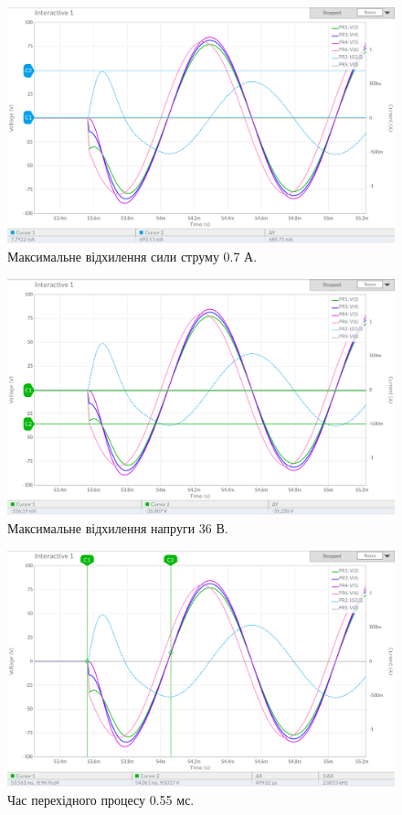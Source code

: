 \documentclass{article}
\begin{document}
\begin{normalsize}
	\begin{figure}[H]
		\centering
		\includegraphics[width=\textwidth]{111}
		\caption{Максимальне відхилення сили струму 0.7 А.}
	\end{figure}

	\begin{figure}[H]
		\centering
		\includegraphics[width=\textwidth]{112}
		\caption{Максимальне відхилення напруги 36 В.}
	\end{figure}

	\begin{figure}[H]
		\centering
		\includegraphics[width=\textwidth]{113}
		\caption{Час перехідного процесу 0.55 мс.}
	\end{figure}


\end{normalsize}
\end{document}

